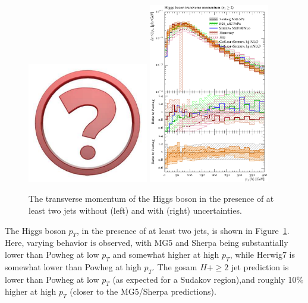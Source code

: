 \begin{figure}[t!]
  \centering
  \includegraphics[width=0.47\textwidth]{Micon.pdf}
  \hfill
  \includegraphics[width=0.47\textwidth]{figures/hjetscomp_H_jj_pT_incl.pdf}
  \caption{
    The transverse momentum of the Higgs boson in the presence
    of at least two jets without (left) and with (right) uncertainties.
    \label{fig:higgscomp:results:2obs:hpt_j2pt}
  }
\end{figure}

The Higgs boson $p_T$, in the presence of at least two jets, is shown
in Figure~\ref{fig:higgscomp:results:2obs:hpt_j2pt}. Here, varying
behavior is observed, with MG5 and Sherpa being substantially lower
than Powheg at low $p_T$ and somewhat higher at high $p_T$, while
Herwig7 is somewhat lower than Powheg at high $p_T$. The gosam
$H+\ge2$ jet prediction is lower than Powheg at low $p_T$ (as expected
for a Sudakov region),and roughly 10\% higher at high $p_T$ (closer to
the MG5/Sherpa predictions).

